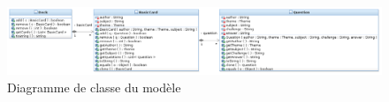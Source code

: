 \begin{figure}[h]
	\centering
	\includegraphics[width=\textwidth]{TTMC_Model_Diagram.png}
	\caption{Diagramme de classe du modèle}
	\label{fig:diag_modele}
\end{figure}